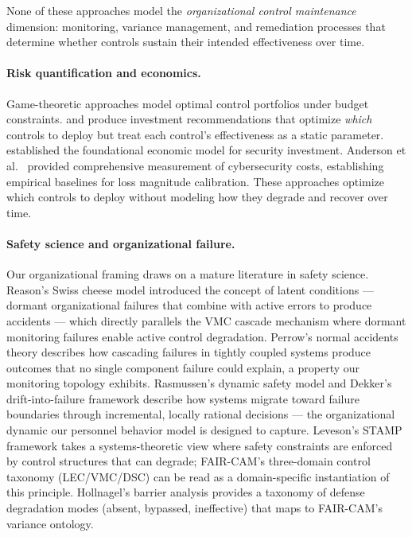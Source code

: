 \documentclass[11pt,a4paper]{article}
\begin{document}
None of these approaches model the \emph{organizational control maintenance} dimension: monitoring, variance management, and remediation processes that determine whether controls sustain their intended effectiveness over time.

\paragraph{Risk quantification and economics.} Game-theoretic approaches model optimal control portfolios under budget constraints. \citet{Fielder2016} and \citet{Panaousis2014} produce investment recommendations that optimize \emph{which} controls to deploy but treat each control's effectiveness as a static parameter. \citet{Gordon2002} established the foundational economic model for security investment. Anderson et al.\ \citep{Anderson2013} provided comprehensive measurement of cybersecurity costs, establishing empirical baselines for loss magnitude calibration. These approaches optimize which controls to deploy without modeling how they degrade and recover over time.

\paragraph{Safety science and organizational failure.} Our organizational framing draws on a mature literature in safety science. Reason's Swiss cheese model \citep{Reason1990} introduced the concept of latent conditions --- dormant organizational failures that combine with active errors to produce accidents --- which directly parallels the VMC cascade mechanism where dormant monitoring failures enable active control degradation. Perrow's normal accidents theory \citep{Perrow1984} describes how cascading failures in tightly coupled systems produce outcomes that no single component failure could explain, a property our monitoring topology exhibits. Rasmussen's dynamic safety model \citep{Rasmussen1997} and Dekker's drift-into-failure framework \citep{Dekker2011} describe how systems migrate toward failure boundaries through incremental, locally rational decisions --- the organizational dynamic our personnel behavior model is designed to capture. Leveson's STAMP framework \citep{Leveson2012} takes a systems-theoretic view where safety constraints are enforced by control structures that can degrade; FAIR-CAM's three-domain control taxonomy (LEC/VMC/DSC) can be read as a domain-specific instantiation of this principle. Hollnagel's barrier analysis \citep{Hollnagel2004} provides a taxonomy of defense degradation modes (absent, bypassed, ineffective) that maps to FAIR-CAM's variance ontology.
\end{document}
